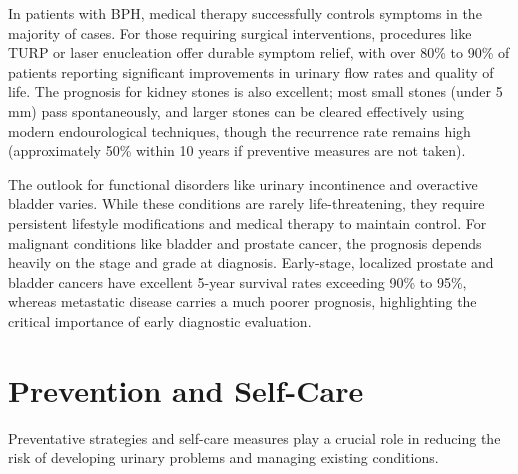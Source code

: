 In patients with BPH, medical therapy successfully controls symptoms in the majority of cases. For those requiring surgical interventions, procedures like TURP or laser enucleation offer durable symptom relief, with over 80\% to 90\% of patients reporting significant improvements in urinary flow rates and quality of life. The prognosis for kidney stones is also excellent; most small stones (under 5 mm) pass spontaneously, and larger stones can be cleared effectively using modern endourological techniques, though the recurrence rate remains high (approximately 50\% within 10 years if preventive measures are not taken).

The outlook for functional disorders like urinary incontinence and overactive bladder varies. While these conditions are rarely life-threatening, they require persistent lifestyle modifications and medical therapy to maintain control. For malignant conditions like bladder and prostate cancer, the prognosis depends heavily on the stage and grade at diagnosis. Early-stage, localized prostate and bladder cancers have excellent 5-year survival rates exceeding 90\% to 95\%, whereas metastatic disease carries a much poorer prognosis, highlighting the critical importance of early diagnostic evaluation.

\section*{Prevention and Self-Care}
Preventative strategies and self-care measures play a crucial role in reducing the risk of developing urinary problems and managing existing conditions.

